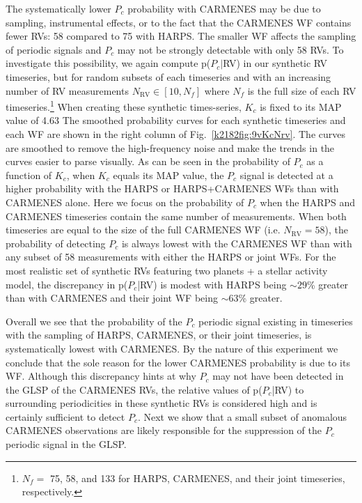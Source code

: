 The systematically lower $P_c$ probability with CARMENES may be due to sampling, instrumental effects, or to the fact
that the CARMENES WF contains fewer RVs: 58 compared to 75
with HARPS. The smaller WF affects the sampling of periodic signals and $P_c$ may not be strongly
detectable with only 58 RVs.
To investigate this possibility, we again compute p($P_c|$RV) in our synthetic RV timeseries, but for
random subsets  of each timeseries and with an increasing number of RV measurements 
$N_{\text{RV}} \in [10,N_f]$ where $N_f$ is the full size
of each RV timeseries.\footnote{$N_f =$ 75, 58, and 133 for HARPS, CARMENES, and their joint timeseries,
  respectively.} When creating these synthetic times-series, $K_c$ is fixed to its MAP value of 4.63 
The smoothed probability curves for each synthetic timeseries and each WF are shown in the right
column of Fig.~\ref{k2182fig:9vKcNrv}. The curves are smoothed to remove the  high-frequency noise and make the trends in the
curves easier to parse visually. As can be seen in the probability of $P_c$ as a function of $K_c$, when $K_c$ equals
its MAP value, the $P_c$ signal is detected at a higher probability with the HARPS or HARPS+CARMENES
WFs than with CARMENES alone. Here we focus on the probability of $P_c$ when the HARPS and CARMENES timeseries
contain the same number of measurements.
When both timeseries are equal to the size of the full CARMENES WF (i.e. $N_{\text{RV}}=58$), the
probability of detecting $P_c$ is always lowest with the CARMENES WF than with any subset of 58 measurements with
either the HARPS or joint WFs. For the most realistic set of synthetic RVs featuring two planets + a stellar activity
model, the discrepancy in p($P_c$|RV) is modest with HARPS being $\sim 29$\% greater than with CARMENES and
their joint WF being $\sim 63$\% greater.

Overall we see that the probability of the $P_c$ periodic signal existing in timeseries with the sampling of HARPS,
CARMENES, or their joint timeseries, is systematically lowest with CARMENES. By the nature of this experiment we
conclude that the sole reason for the  lower CARMENES probability is due to its WF. Although this discrepancy hints
at why  $P_c$ may not have been detected in the GLSP of the CARMENES RVs, the relative values of p($P_c$|RV) to
surrounding periodicities in these synthetic RVs is considered high and is certainly sufficient to detect $P_c$.
Next we show that a small subset of anomalous CARMENES observations are likely responsible for the suppression
of the $P_c$ periodic signal in the GLSP.


